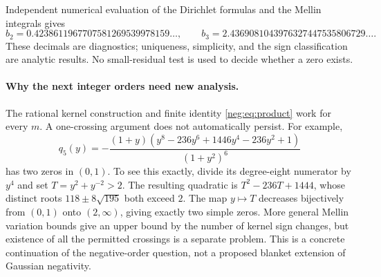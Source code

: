 Independent numerical evaluation of the Dirichlet formulas and the
Mellin integrals gives
\[
 b_2=0.4238611967707581269539978159\ldots,
 \qquad b_3=2.4369081043976327447535806729\ldots.
\]
These decimals are diagnostics; uniqueness, simplicity, and the sign
classification are analytic results. No small-residual test is used
to decide whether a zero exists.

\paragraph{Why the next integer orders need new analysis.}
The rational kernel construction and finite identity
\eqref{neg:eq:product} work for every $m$. A one-crossing argument
does not automatically persist. For example,
\[
 q_5(y)=-\frac{(1+y)
 (y^8-236y^6+1446y^4-236y^2+1)}{(1+y^2)^6}
\]
has two zeros in $(0,1)$. To see this exactly, divide its degree-eight
numerator by $y^4$ and set $T=y^2+y^{-2}>2$. The resulting quadratic
is $T^2-236T+1444$, whose distinct roots $118\pm8\sqrt{195}$
both exceed $2$. The map $y\mapsto T$ decreases bijectively from
$(0,1)$ onto $(2,\infty)$, giving exactly two simple zeros.
More general Mellin variation bounds give
an upper bound by the number of kernel sign changes, but existence
of all the permitted crossings is a separate problem. This is a
concrete continuation of the negative-order question, not a proposed
blanket extension of Gaussian negativity.
